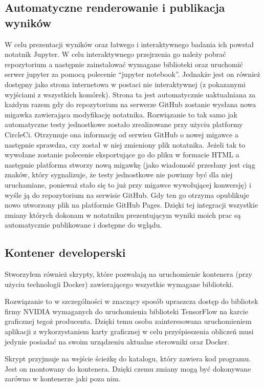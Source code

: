 \documentclass{article}
\begin{document}
\subsection{Automatyczne renderowanie i publikacja wyników}
W celu prezentacji wyników oraz łatwego i interaktywnego badania ich powstał notatnik Jupyter.
W celu interaktywnego przejrzenia go należy pobrać repozytorium a następnie zainstalować wymagane biblioteki oraz uruchomić serwer jupyter za pomocą polecenie ``jupyter notebook''.
Jednakże jest on również dostępny jako strona internetowa w postaci nie interaktywnej (z pokazanymi wyjściami z wszystkich komórek).
Strona ta jest automatycznie uaktualniana za każdym razem gdy do repozytorium na serwerze GitHub zostanie wysłana nowa migawka zawierająca modyfikację notatnika.
Rozwiązanie to tak samo jak automatyczne testy jednostkowe zostało zrealizowane przy użyciu platformy CircleCi.
Otrzymuje ona informację od serwisu GitHub o nowej migawce a następnie sprawdza, czy został w niej zmieniony plik notatnika.
Jeżeli tak to wywołane zostanie polecenie eksportujące go do pliku w formacie HTML a następnie platforma stworzy nową migawkę (jako wiadomość przesłany jest ciąg znaków, który sygnalizuje, że testy jednostkowe nie powinny być dla niej uruchamiane, ponieważ stało się to już przy migawce wywołującej konwersję) i wyśle ją do repozytorium na serwisie GitHub.
Gdy ten go otrzyma opublikuje nowo utworzony plik na platformie GitHub Pages.
Dzięki tej integracji wszystkie zmiany których dokonam w notatniku prezentującym wyniki moich prac są automatycznie publikowane i dostępne do wglądu.
\subsection{Kontener developerski}
Stworzyłem również skrypty, które pozwalają na uruchomienie kontenera (przy użyciu technologii Docker) zawierającego wszystkie wymagane biblioteki.

Rozwiązanie to w szczególności w znaczący sposób upraszcza dostęp do bibliotek firmy NVIDIA wymaganych do uruchomienia biblioteki TensorFlow na karcie graficznej tegoż producenta.
Dzięki temu osoba zainteresowana uruchomieniem aplikacji z wykorzystaniem karty graficznej w celu przyśpieszenia obliczeń musi jedynie posiadać na swoim urządzeniu aktualne sterowniki oraz Docker.

Skrypt przyjmuje na wejście ścieżkę do katalogu, który zawiera kod programu.
Jest on montowany do kontenera.
Dzięki czemu zmiany mogą być dokonywane zarówno w kontenerze jaki poza nim.
\newpage
\end{document}
